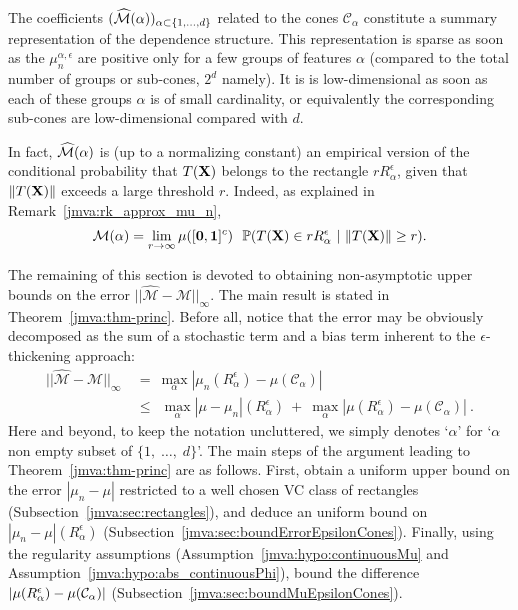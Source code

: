 The coefficients $(\widehat{\mathcal{M}}(\alpha))_{\alpha\subset\{1,\ldots,d\}}$ related to the cones $\mathcal{C}_\alpha$ constitute a summary representation of the dependence structure.  %
This representation is sparse as soon as the $\mu_n^{\alpha,  \epsilon}$ are positive only for a few groups of features $\alpha$ (compared to the total number of groups or sub-cones, $2^d$ namely). It is  is low-dimensional as soon as each of these groups $\alpha$ is of small cardinality, or equivalently the corresponding sub-cones are low-dimensional compared with $d$.

In fact, $\widehat{\mathcal{M}}(\alpha)$ is (up to a normalizing constant) an empirical version of the  conditional probability that $T(\mathbf X)$ belongs to the rectangle $ r R_\alpha^\epsilon$, given that $\|T(\mathbf X)\|$ exceeds  a large threshold $r$. Indeed, as explained in Remark~\ref{jmva:rk_approx_mu_n},  
\begin{align}\label{jmva:eq:interprete_mun_Pcondit}
\mathcal{M}(\alpha) = \lim_{r \to \infty} \mu([\mathbf 0,\mathbf{1}]^c)~~\mathbb{P}(T(\mathbf X)\in r R_\alpha^\epsilon ~|~ \|T(\mathbf X)\|\ge r) . 
\end{align}

The remaining of this section is devoted to obtaining non-asymptotic upper bounds on the error $\vert\vert \widehat{\mathcal{M}}-\mathcal{M}\vert\vert_{\infty}$. 
The main result is stated in Theorem~\ref{jmva:thm-princ}. 
Before all, notice that the error may be obviously decomposed as the sum of a stochastic term and a bias term inherent to the $\epsilon$-thickening approach:
\begin{align}
\vert\vert \widehat{\mathcal{M}}-\mathcal{M}\vert\vert_{\infty} &~=~\max_{\alpha} |
\mu_n(R_\alpha^\epsilon)-\mu(\mathcal{C}_\alpha)|\nonumber
\\&~\le~ ~\max_\alpha |\mu-\mu_n|(R_\alpha^\epsilon) ~+~ \max_\alpha|\mu(R_\alpha^\epsilon)-\mu(\mathcal{C}_\alpha)|~.\label{jmva:error_decomp} 
\end{align}
Here and beyond, to keep the notation uncluttered, we simply denotes `$\alpha$'  for `$\alpha$ non empty subset of $\{1,\; \ldots,\;d\}$'. The main steps of the argument leading to Theorem~\ref{jmva:thm-princ} are  as follows. First, obtain a uniform upper bound on the error $|\mu_n - \mu|$ restricted to a well chosen VC class of rectangles (Subsection~\ref{jmva:sec:rectangles}), and deduce an uniform bound on  $|\mu_n - \mu|(R_\alpha^\epsilon)$ (Subsection~\ref{jmva:sec:boundErrorEpsilonCones}). Finally, using the regularity assumptions (Assumption~\ref{jmva:hypo:continuousMu} and Assumption~\ref{jmva:hypo:abs_continuousPhi}), bound the difference $|\mu(R_\alpha^\epsilon) - \mu(\mathcal{C}_\alpha)|$ (Subsection~\ref{jmva:sec:boundMuEpsilonCones}). 


